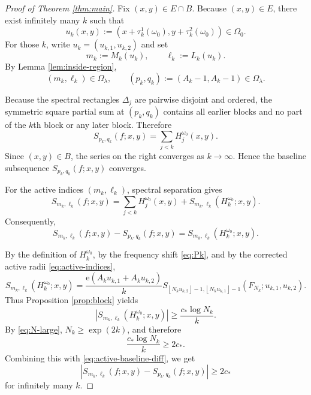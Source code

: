 \documentclass[11pt]{amsart}
\numberwithin{equation}{section}
\begin{document}
\begin{proof}[Proof of Theorem \protect\ref{thm:main}]
Fix $(x,y)\in E\cap B$. Because $(x,y)\in E$, there exist infinitely many $k$
such that 
\begin{equation*}
u_k(x,y):=(x+\tau_k^1(\omega_0),y+\tau_k^2(\omega_0)) \in\Omega_0.
\end{equation*}
For those $k$, write $u_k=(u_{k,1},u_{k,2})$ and set 
\begin{equation}  \label{eq:mkellk}
m_k:=M_k(u_k), \qquad \ell_k:=L_k(u_k).
\end{equation}
By Lemma \ref{lem:inside-region}, 
\begin{equation*}
(m_k,\ell_k)\in\Omega_\lambda, \qquad
(p_k,q_k):=(A_k-1,A_k-1)\in\Omega_\lambda.
\end{equation*}

Because the spectral rectangles $\Delta_j$ are pairwise disjoint and
ordered, the symmetric square partial sum at $(p_k,q_k)$ contains all
earlier blocks and no part of the $k$th block or any later block. Therefore 
\begin{equation}  \label{eq:baseline-sum}
S_{p_k,q_k}(f;x,y)=\sum_{j<k}H_j^{\omega_0}(x,y).
\end{equation}
Since $(x,y)\in B$, the series on the right converges as $k\to\infty$. Hence
the baseline subsequence $S_{p_k,q_k}(f;x,y)$ converges.

For the active indices $(m_k,\ell_k)$, spectral separation gives 
\begin{equation}  \label{eq:active-sum}
S_{m_k,\ell_k}(f;x,y) =\sum_{j<k}H_j^{\omega_0}(x,y)
+S_{m_k,\ell_k}(H_k^{\omega_0};x,y).
\end{equation}
Consequently, 
\begin{equation}  \label{eq:active-baseline-diff}
S_{m_k,\ell_k}(f;x,y)-S_{p_k,q_k}(f;x,y) =S_{m_k,\ell_k}(H_k^{\omega_0};x,y).
\end{equation}

By the definition of $H_{k}^{\omega _{0}}$, by the frequency shift %
\eqref{eq:Pk}, and by the corrected active radii \eqref{eq:active-indices}, 
\begin{equation*}
S_{m_{k},\ell _{k}}(H_{k}^{\omega _{0}};x,y)=\frac{\mathrm{e}\!\left(
A_{k}u_{k,1}+A_{k}u_{k,2}\right) }{k}S_{\left\lfloor
N_{k}u_{k,2}\right\rfloor -1,\left\lfloor N_{k}u_{k,1}\right\rfloor
-1}(F_{N_{k}};u_{k,1},u_{k,2}).
\end{equation*}%
Thus Proposition \ref{prop:block} yields 
\begin{equation}
\left\vert S_{m_{k},\ell _{k}}(H_{k}^{\omega _{0}};x,y)\right\vert \geq 
\frac{c_{\ast }\log N_{k}}{k}.  \label{eq:large-difference}
\end{equation}%
By \eqref{eq:N-large}, $N_{k}\geq \exp (2k)$, and therefore 
\begin{equation*}
\frac{c_{\ast }\log N_{k}}{k}\geq 2c_{\ast }.
\end{equation*}%
Combining this with \eqref{eq:active-baseline-diff}, we get 
\begin{equation}
\left\vert S_{m_{k},\ell _{k}}(f;x,y)-S_{p_{k},q_{k}}(f;x,y)\right\vert \geq
2c_{\ast }  \label{eq:gap}
\end{equation}%
for infinitely many $k$.


\end{proof}
\end{document}
